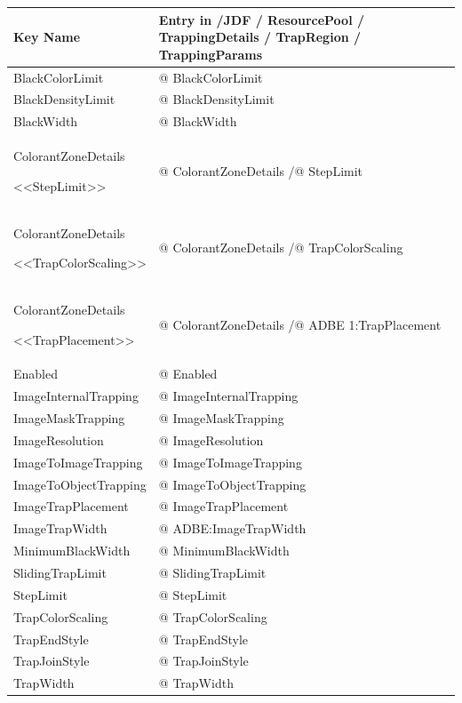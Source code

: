 \documentclass[letterpaper,12pt,english,openany,oneside]{sphinxmanual}
\begin{document}
\begin{savenotes}\sphinxattablestart
\centering
{}\label{\detokenize{PDF_Create_JDF:section-2}}\nobreak
\begin{tabulary}{\linewidth}[t]{|T|T|}
\hline
\sphinxstyletheadfamily 
Key Name
&\sphinxstyletheadfamily 
Entry in /JDF / ResourcePool / TrappingDetails / TrapRegion / TrappingParams
\\
\hline
BlackColorLimit
&
@ BlackColorLimit
\\
\hline
BlackDensityLimit
&
@ BlackDensityLimit
\\
\hline
BlackWidth
&
@ BlackWidth
\\
\hline
ColorantZoneDetails

<<StepLimit>>
&
@ ColorantZoneDetails /@ StepLimit
\\
\hline
ColorantZoneDetails

<<TrapColorScaling>>
&
@ ColorantZoneDetails /@ TrapColorScaling
\\
\hline
ColorantZoneDetails

<<TrapPlacement>>
&
@ ColorantZoneDetails /@ ADBE 1:TrapPlacement
\\
\hline
Enabled
&
@ Enabled
\\
\hline
ImageInternalTrapping
&
@ ImageInternalTrapping
\\
\hline
ImageMaskTrapping
&
@ ImageMaskTrapping
\\
\hline
ImageResolution
&
@ ImageResolution
\\
\hline
ImageToImageTrapping
&
@ ImageToImageTrapping
\\
\hline
ImageToObjectTrapping
&
@ ImageToObjectTrapping
\\
\hline
ImageTrapPlacement
&
@ ImageTrapPlacement
\\
\hline
ImageTrapWidth
&
@ ADBE:ImageTrapWidth
\\
\hline
MinimumBlackWidth
&
@ MinimumBlackWidth
\\
\hline
SlidingTrapLimit
&
@ SlidingTrapLimit
\\
\hline
StepLimit
&
@ StepLimit
\\
\hline
TrapColorScaling
&
@ TrapColorScaling
\\
\hline
TrapEndStyle
&
@ TrapEndStyle
\\
\hline
TrapJoinStyle
&
@ TrapJoinStyle
\\
\hline
TrapWidth
&
@ TrapWidth
\\
\hline
\end{tabulary}
\par
\sphinxattableend\end{savenotes}
\end{document}
